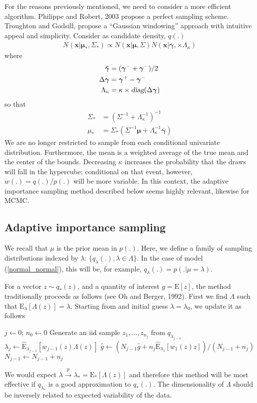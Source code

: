 \documentclass{article}
\begin{document}
For the reasons previously mentioned, we need to consider a more
efficient algorithm. Philippe and Robert, 2003 propose a perfect
sampling scheme. Troughton and Godsill, propose a ``Gaussian
windowing'' approach with intuitive appeal and simplicity. Consider
as candidate density, $q(.)$
\begin{align}
N(\mathbf{x}|\boldsymbol{\mu}_*,\Sigma_*)\propto
N(\mathbf{x}|\boldsymbol{\mu},\Sigma)N(\mathbf{x}|\boldsymbol{\bar\gamma},\times
 \Lambda_{\kappa})
\end{align}where
\begin{align}
\boldsymbol{\bar\gamma}
&=(\boldsymbol{\gamma}^{-}+\boldsymbol{\gamma}^{-})/2\\
\Delta\boldsymbol\gamma&=\boldsymbol{\gamma}^{+}-\boldsymbol{\gamma}^{-}\\
\Lambda_{\kappa}&=\kappa\times\textsl{diag}(\Delta\boldsymbol\gamma)
\end{align}so that
\begin{align}
\Sigma_*&=(\Sigma^{-1}+\Lambda_{\kappa}^{-1})^{-1}\\
\mu_*&=\Sigma_*(\Sigma^{-1}\boldsymbol{\mu}+\Lambda_{\kappa}^{-1}\boldsymbol{\bar{\gamma}})
\end{align}We are no longer restricted to sample from each
conditional univariate distribution. Furthermore, the mean is a
weighted average of the true mean and the center of the bounds.
Decreasing $\kappa$ increases the probability that the draws will
fall in the hypercube; conditional on that event, however,
$w(.)=q(.)/p(.)$ will be more variable. In this context, the
adaptive importance sampling method described below seems highly
relevant, likewise for MCMC.

\subsection{Adaptive importance sampling}
We recall that $\mu$ is the prior mean in $p(.)$. Here, we define a
family of sampling distributions indexed by $\lambda$:
$\{q_{\lambda}(.),\lambda\in \Lambda\}$. In the case of model
(\ref{normal_normal}), this will be, for example,
$q_{\lambda}(.)=p(.|\mu=\lambda)$.

For a vector $z\sim q_*(z)$, and a quantity of interest
$g=\mathrm{E}[z]$, the method traditionally proceeds as follows (see
Oh and Berger, 1992). First we find $\Lambda$ such that
$\mathrm{E}_\lambda[\Lambda(z)]=\lambda$. Starting from and initial
guess $\lambda=\lambda_0$, we update it as follows
\begin{algorithmic}
\STATE $j\leftarrow 0$; $n_0\leftarrow 0$  \STATE
Generate an iid sample $z_1,...,z_{n_{j}}$ from $q_{\lambda_{j-1}}$
\STATE
$\lambda_{j}\leftarrow\hat{\mathrm{E}}_{\lambda_{j-1}}[w_{j-1}(z)\Lambda(z)]$
\STATE $\hat g \leftarrow (N_{j-1} \hat g + n_j
\hat{\mathrm{E}}_{\lambda_1}[w_1(z)z])/(N_{j-1}+n_j)$ \STATE
$N_{j-1}\leftarrow N_{j-1}+n_j$\ENDFOR
\end{algorithmic}
We would expect $\lambda
\xrightarrow{p}\lambda_*=\mathrm{E}_*[\Lambda(z)]$ and therefore
this method will be most effective if $q_{\lambda_*}$ is a good
approximation to $q_*(.)$. The dimensionality of $\Lambda$ should be
inversely related to expected variability of the data.
\end{document}
